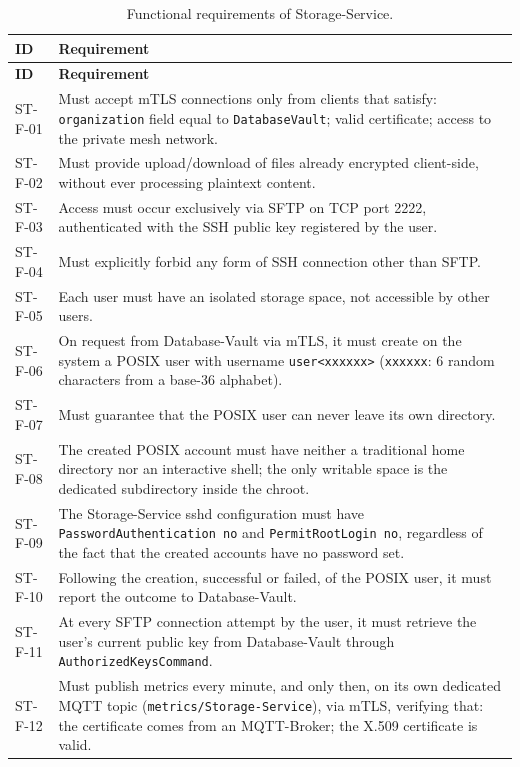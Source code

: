 \begin{longtable}{p{2.6cm} p{\dimexpr\linewidth-2.6cm-4\tabcolsep\relax}}
\caption{Functional requirements of Storage-Service.} \\
\hline
\textbf{ID} & \textbf{Requirement} \\
\hline
\endfirsthead
\hline
\textbf{ID} & \textbf{Requirement} \\
\hline
\endhead
\hline
\endfoot
\hline
\endlastfoot
ST-F-01 & Must accept mTLS connections only from clients that satisfy: \texttt{organization} field equal to \texttt{DatabaseVault}; valid certificate; access to the private mesh network. \\
ST-F-02 & Must provide upload/download of files already encrypted client-side, without ever processing plaintext content. \\
ST-F-03 & Access must occur exclusively via SFTP on TCP port 2222, authenticated with the SSH public key registered by the user. \\
ST-F-04 & Must explicitly forbid any form of SSH connection other than SFTP. \\
ST-F-05 & Each user must have an isolated storage space, not accessible by other users. \\
ST-F-06 & On request from Database-Vault via mTLS, it must create on the system a POSIX user with username \texttt{user<xxxxxx>} (\texttt{xxxxxx}: 6 random characters from a base-36 alphabet). \\
ST-F-07 & Must guarantee that the POSIX user can never leave its own directory. \\
ST-F-08 & The created POSIX account must have neither a traditional home directory nor an interactive shell; the only writable space is the dedicated subdirectory inside the chroot. \\
ST-F-09 & The Storage-Service sshd configuration must have \texttt{PasswordAuthentication no} and \texttt{PermitRootLogin no}, regardless of the fact that the created accounts have no password set. \\
ST-F-10 & Following the creation, successful or failed, of the POSIX user, it must report the outcome to Database-Vault. \\
ST-F-11 & At every SFTP connection attempt by the user, it must retrieve the user's current public key from Database-Vault through \texttt{AuthorizedKeysCommand}. \\
ST-F-12 & Must publish metrics every minute, and only then, on its own dedicated MQTT topic (\texttt{metrics/Storage-Service}), via mTLS, verifying that: the certificate comes from an MQTT-Broker; the X.509 certificate is valid. \\

\end{longtable}
